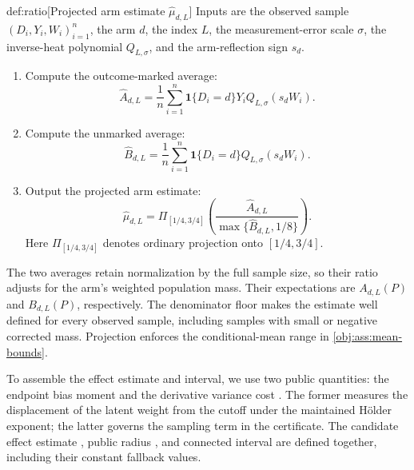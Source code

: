 \documentclass[11pt]{article}
\begin{document}
\begin{algorithmv}{def:ratio}[Projected arm estimate $\widehat\mu_{d,L}$]
Inputs are the observed sample \((D_i,Y_i,W_i)_{i=1}^n\), the arm \(d\), the index \(L\), the measurement-error scale \(\sigma\), the inverse-heat polynomial \(Q_{L,\sigma}\), and the arm-reflection sign \(s_d\).
\begin{enumerate}
\item Compute the outcome-marked average:
\[
\widehat A_{d,L}
=
\frac1n\sum_{i=1}^n
\mathbf1\{D_i=d\}Y_iQ_{L,\sigma}(s_dW_i).
\]
\item Compute the unmarked average:
\[
\widehat B_{d,L}
=
\frac1n\sum_{i=1}^n
\mathbf1\{D_i=d\}Q_{L,\sigma}(s_dW_i).
\]
\item Output the projected arm estimate:
\[
\widehat\mu_{d,L}
=
\Pi_{[1/4,3/4]}
\left(
\frac{\widehat A_{d,L}}
{\max\{\widehat B_{d,L},1/8\}}
\right).
\]
Here \(\Pi_{[1/4,3/4]}\) denotes ordinary projection onto \([1/4,3/4]\).
\end{enumerate}
\end{algorithmv}

The two averages retain normalization by the full sample size, so their ratio adjusts for the arm's weighted population mass. Their expectations are \(A_{d,L}(P)\) and \(B_{d,L}(P)\), respectively. The denominator floor makes the estimate well defined for every observed sample, including samples with small or negative corrected mass. Projection enforces the conditional-mean range in \cref{obj:ass:mean-bounds}.

To assemble the effect estimate and interval, we use two public quantities: the endpoint bias moment  and the derivative variance cost . The former measures the displacement of the latent weight from the cutoff under the maintained Hölder exponent; the latter governs the sampling term in the certificate. The candidate effect estimate , public radius , and connected interval  are defined together, including their constant fallback values.
\end{document}
